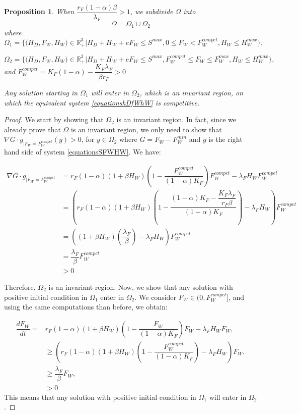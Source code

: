 \documentclass{article}
\newcommand{\lfw}{\lambda_{F}}
\newcommand{\lfw}{\lambda_{F}}
\newtheorem{prop}{Proposition}
\begin{document}
\begin{prop}
When $\dfrac{r_F(1-\alpha) \beta}{\lfw} > 1$, we subdivide $\Omega$ into
$$
\Omega = \Omega_1 \cup \Omega_2
$$
where
$$
\Omega_1 = \Big\{\Big(H_D, F_W, H_W \Big) \in \mathbb{R}_+^3  \Big|H_D + H_W + eF_W \leq S^{max}, 0 \leq F_W < F_W^{compet}, H_W \leq H_W^{max} \Big\},
$$

$$
\Omega_2 = \Big\{\Big(H_D, F_W, H_W \Big) \in \mathbb{R}_+^3  \Big|H_D + H_W + eF_W \leq S^{max}, F_W^{compet} \leq F_W \leq F_W^{max}, H_W \leq H_W^{max} \Big\},
$$
and
$F_W^{compet} = K_F(1-\alpha) - \dfrac{K_F \lfw}{\beta r_F} > 0
$

Any solution starting in $\Omega_1$ will enter in $\Omega_2$, which is an invariant region, on which the equivalent system \eqref{equationshDfWhW} is competitive.
\end{prop}

\begin{proof}
We start by showing that $\Omega_2$ is an invariant region. In fact, since we already prove that $\Omega$ is an invariant region, we only need to show that 
$\nabla G \cdot g _{|F_W = F_W^{compet}}(y) > 0$, for $y \in \Omega_2$ where $G = F_W - F_W^{min}$ and $g$ is the right hand side of system \eqref{equationsSFWHW}. We have:

\begin{align*}
\nabla G \cdot g _{|F_W = F_W^{compet}} &= r_F(1-\alpha)(1+\beta H_W) \left(1 - \dfrac{F_W^{compet}}{(1-\alpha) K_F} \right)F_W^{compet} - \lfw H_W F^{compet}_W \\
&= \left(r_F(1-\alpha)(1+\beta H_W) \left(1 - \dfrac{(1-\alpha) K_F - \dfrac{K_F \lfw}{r_F \beta}}{(1-\alpha) K_F}\right) - \lfw H_W \right) F^{compet}_W \\
&= \left((1+\beta H_W) \left( \dfrac{\lfw}{\beta}\right) - \lfw H_W \right) F^{compet}_W \\
&= \dfrac{\lfw}{\beta} F_W^{compet} \\
&> 0
\end{align*}

Therefore, $\Omega_2$ is an invariant region. Now, we show that any solution with positive initial condition in $ \Omega_1$ enter in $\Omega_2$. We consider $F_W \in (0, F_W^{compet}]$, and using the same computations than before, we obtain:

\begin{align*}
\dfrac{dF_W}{dt} = &r_F(1-\alpha)(1+\beta H_W) \left(1 - \dfrac{F_W}{(1-\alpha) K_F}\right)F_W - \lfw H_W  F_W, \\
& \geq \left(r_F(1-\alpha)(1+\beta H_W) \left(1 - \dfrac{F_W^{compet}}{(1-\alpha) K_F}\right) - \lfw H_W  \right) F_W, \\
& \geq \dfrac{\lfw}{\beta} F_W,\\
&> 0
\end{align*}
This means that any solution with positive initial condition in $\Omega_1$ will enter in $\Omega_2$.
\end{proof}
\end{document}
